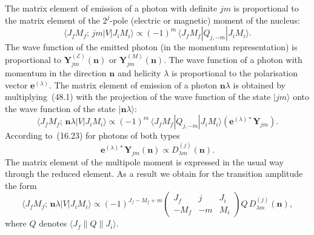 The matrix element of emission of a photon with definite $jm$ is proportional to the matrix element of the $2^j$-pole (electric or magnetic) moment of the nucleus:
\begin{equation}
\langle J_f M_f;\,jm|V|J_i M_i\rangle \propto (-1)^m\,\langle J_f M_f|Q_{j,-m}|J_i M_i\rangle.
\tag{48.1}
\end{equation}
The wave function of the emitted photon (in the momentum representation) is proportional to $\mathbf{Y}^{(\mathscr{E})}_{jm}(\mathbf{n})$ or $\mathbf{Y}^{(M)}_{jm}(\mathbf{n})$. The wave function of a photon with momentum in the direction $\mathbf{n}$ and helicity $\lambda$ is proportional to the polarisation vector $\mathbf{e}^{(\lambda)}$. The matrix element of emission of a photon $\mathbf{n}\lambda$ is obtained by multiplying~(48.1) with the projection of the wave function of the state $|jm\rangle$ onto the wave function of the state $|\mathbf{n}\lambda\rangle$:
\[
\langle J_f M_f;\,\mathbf{n}\lambda|V|J_i M_i\rangle \propto (-1)^m\,\langle J_f M_f|Q_{j,-m}|J_i M_i\rangle(\mathbf{e}^{(\lambda)*}\mathbf{Y}_{jm}).
\]
According to~(16.23) for photons of both types
\begin{equation}
\mathbf{e}^{(\lambda)*}\mathbf{Y}_{jm}(\mathbf{n}) \propto D^{(j)}_{\lambda m}(\mathbf{n}).
\tag{48.2}
\end{equation}
The matrix element of the multipole moment is expressed in the usual way through the reduced element. As a result we obtain for the transition amplitude the form
\begin{equation}
\langle J_f M_f;\,\mathbf{n}\lambda|V|J_i M_i\rangle \propto (-1)^{J_f - M_f + m}\begin{pmatrix} J_f & j & J_i \\ -M_f & -m & M_i\end{pmatrix}Q\,D^{(j)}_{\lambda m}(\mathbf{n}),
\tag{48.3}
\end{equation}
where $Q$ denotes $\langle J_f\|Q\|J_i\rangle$.

